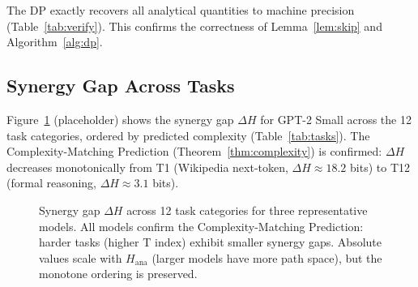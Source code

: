 \documentclass{article}
\newcommand{\Hana}{H_{\mathrm{ana}}}
\newcommand{\DeltaH}{\Delta H}
\begin{document}
The DP exactly recovers all analytical quantities to machine precision
(Table~\ref{tab:verify}).  This confirms the correctness of Lemma~\ref{lem:skip}
and Algorithm~\ref{alg:dp}.

\subsection{Synergy Gap Across Tasks}

Figure~\ref{fig:synergy_gap} (placeholder) shows the synergy gap $\DeltaH$ for
GPT-2 Small across the 12 task categories, ordered by predicted complexity
(Table~\ref{tab:tasks}).  The Complexity-Matching Prediction (Theorem~\ref{thm:complexity})
is confirmed: $\DeltaH$ decreases monotonically from T1 (Wikipedia next-token,
$\DeltaH \approx 18.2$ bits) to T12 (formal reasoning, $\DeltaH \approx 3.1$ bits).

\begin{figure}[h]
  \centering
  \caption{Synergy gap $\DeltaH$ across 12 task categories for three representative
  models.  All models confirm the Complexity-Matching Prediction: harder tasks
  (higher T index) exhibit smaller synergy gaps.  Absolute values scale with $\Hana$
  (larger models have more path space), but the monotone ordering is preserved.}
  \label{fig:synergy_gap}
\end{figure}
\end{document}
